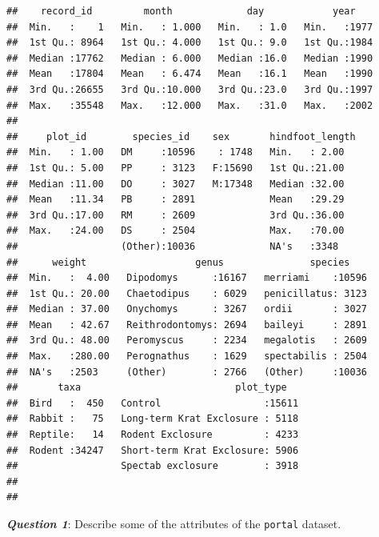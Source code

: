 \documentclass[]{article}
\newenvironment{Shaded}{\begin{snugshade}}{\end{snugshade}}
\newcommand{\KeywordTok}[1]{\textcolor[rgb]{0.13,0.29,0.53}{\textbf{{#1}}}}
\newcommand{\StringTok}[1]{\textcolor[rgb]{0.31,0.60,0.02}{{#1}}}
\newcommand{\NormalTok}[1]{{#1}}
\begin{document}
\begin{verbatim}
##    record_id         month             day            year     
##  Min.   :    1   Min.   : 1.000   Min.   : 1.0   Min.   :1977  
##  1st Qu.: 8964   1st Qu.: 4.000   1st Qu.: 9.0   1st Qu.:1984  
##  Median :17762   Median : 6.000   Median :16.0   Median :1990  
##  Mean   :17804   Mean   : 6.474   Mean   :16.1   Mean   :1990  
##  3rd Qu.:26655   3rd Qu.:10.000   3rd Qu.:23.0   3rd Qu.:1997  
##  Max.   :35548   Max.   :12.000   Max.   :31.0   Max.   :2002  
##                                                                
##     plot_id        species_id    sex       hindfoot_length
##  Min.   : 1.00   DM     :10596    : 1748   Min.   : 2.00  
##  1st Qu.: 5.00   PP     : 3123   F:15690   1st Qu.:21.00  
##  Median :11.00   DO     : 3027   M:17348   Median :32.00  
##  Mean   :11.34   PB     : 2891             Mean   :29.29  
##  3rd Qu.:17.00   RM     : 2609             3rd Qu.:36.00  
##  Max.   :24.00   DS     : 2504             Max.   :70.00  
##                  (Other):10036             NA's   :3348   
##      weight                   genus               species     
##  Min.   :  4.00   Dipodomys      :16167   merriami    :10596  
##  1st Qu.: 20.00   Chaetodipus    : 6029   penicillatus: 3123  
##  Median : 37.00   Onychomys      : 3267   ordii       : 3027  
##  Mean   : 42.67   Reithrodontomys: 2694   baileyi     : 2891  
##  3rd Qu.: 48.00   Peromyscus     : 2234   megalotis   : 2609  
##  Max.   :280.00   Perognathus    : 1629   spectabilis : 2504  
##  NA's   :2503     (Other)        : 2766   (Other)     :10036  
##       taxa                           plot_type    
##  Bird   :  450   Control                  :15611  
##  Rabbit :   75   Long-term Krat Exclosure : 5118  
##  Reptile:   14   Rodent Exclosure         : 4233  
##  Rodent :34247   Short-term Krat Exclosure: 5906  
##                  Spectab exclosure        : 3918  
##                                                   
## 
\end{verbatim}

\begin{Shaded}
\end{Shaded}

\textbf{\emph{Question 1}}: Describe some of the attributes of the
\texttt{portal} dataset.
\end{document}
